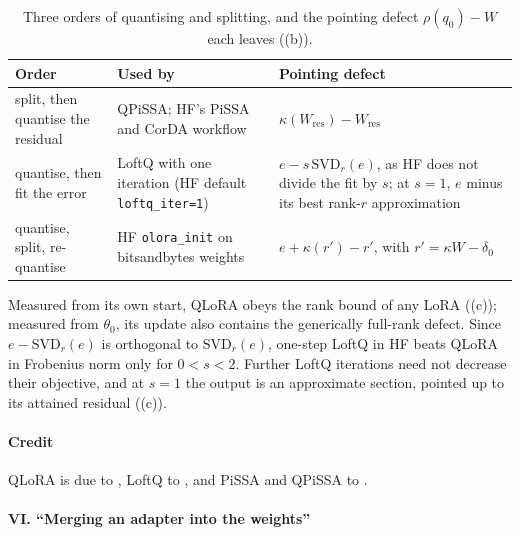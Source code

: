 \begin{table}[t]
\centering\small
\caption{Three orders of quantising and splitting, and the pointing defect $\rho(q_0)-W$ each leaves
((b)).}\label{tab:rosetta-orders}
\renewcommand{\arraystretch}{1.15}
\begin{tabularx}{\linewidth}{@{}>{\raggedright\arraybackslash}p{3.6cm}>{\raggedright\arraybackslash}p{4.4cm}>{\raggedright\arraybackslash}X@{}}
  \toprule
  \headrow \textbf{Order} & \textbf{Used by} & \textbf{Pointing defect}\\
  \midrule
  split, then quantise the residual & QPiSSA; HF's PiSSA and CorDA workflow &
    $\kappa(W_{\mathrm{res}})-W_{\mathrm{res}}$\\
  quantise, then fit the error & LoftQ with one iteration (HF default \texttt{loftq\_iter=1}) &
    $e-s\,\mathrm{SVD}_r(e)$, as HF does not divide the fit by $s$; at $s=1$, $e$ minus its best rank-$r$
    approximation\\
  quantise, split, re-quantise & HF \texttt{olora\_init} on bitsandbytes weights & $e+\kappa(r')-r'$, with
    $r'=\kappa W-\delta_0$\\
  \bottomrule
\end{tabularx}
\end{table}

\begin{explains}
Measured from its own start, QLoRA obeys the rank bound of any LoRA ((c)); measured from
$\theta_0$, its update also contains the generically full-rank defect. Since $e-\mathrm{SVD}_r(e)$ is orthogonal to
$\mathrm{SVD}_r(e)$, one-step LoftQ in HF beats QLoRA in Frobenius norm only for $0<s<2$. Further LoftQ iterations need
not decrease their objective, and at $s=1$ the output is an approximate section, pointed up to its attained residual
((c)).
\end{explains}

\paragraph{Credit}
QLoRA is due to \citet{dettmers2023qlora}, LoftQ to \citet{li2023loftq}, and PiSSA and QPiSSA to
\citet{meng2024pissa}.

\paragraph{VI. ``Merging an adapter into the weights''}

